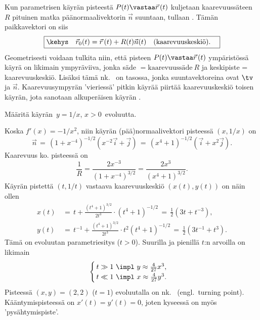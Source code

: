 Kun parametrisen käyrän pisteestä $P(t)\vastaa\vec r\,(t)$ kuljetaan kaarevuussäteen $R$
pituinen matka päänormaalivektorin $\vec n$ suuntaan, tullaan . Tämän
paikkavektori on siis
\[
\boxed{\kehys\quad \vec r_0(t)=\vec r\,(t)+R(t)\vec n(t) \quad\text{(kaarevuuskeskiö)}. \quad}
\]
Geometrisesti voidaan tulkita niin, että pisteen $P(t)\vastaa\vec r\,(t)$ ympäristössä käyrä 
on likimain ympyräviiva, jonka säde $=\text{kaarevuussäde}\ R$ ja keskipiste =
kaarevuuskeskiö. Lisäksi tämä nk.\
%
 on tasossa, jonka suuntavektoreina
ovat $\tv$ ja $\vec n$. Kaarevuusympyrän 'vieriessä' pitkin käyrää piirtää kaarevuuskeskiö
toisen käyrän, jota sanotaan alkuperäisen käyrän \kor{evoluutaksi}.
\begin{Exa} \label{evoluutta} Määritä käyrän $\,y=1/x$, $x>0\,$ evoluutta.
\end{Exa}
\ratk Koska $f'(x)=-1/x^2$, niin käyrän (pää)normaalivektori pisteessä $(x,1/x)$ on
\[
\vec n \,=\, (1+x^{-4})^{-1/2}(x^{-2}\vec i + \vec j)
       \,=\, (x^4+1)^{-1/2}(\vec i + x^2\vec j).
\]
Kaarevuus ko. pisteessä on
\[
\frac{1}{R}=\frac{2x^{-3}}{(1+x^{-4})^{3/2}}=\frac{2x^3}{(x^4+1)^{3/2}}.
\]
Käyrän pistettä $(t,1/t)$ vastaava kaarevuuskeskiö $(x(t),y(t))$ on näin ollen
\begin{align*}
x(t) &\,=\, t+\frac{(t^4+1)^{3/2}}{2t^3}\cdot (t^4+1)^{-1/2} 
      \,=\, \frac{1}{2}(3t+t^{-3}), \\
y(t) &\,=\, t^{-1}+\frac{(t^4+1)^{3/2}}{2t^3}\cdot t^2(t^4+1)^{-1/2} 
      \,=\,\frac{1}{2}(3t^{-1}+t^3).
\end{align*}
Tämä on evoluutan parametriesitys ($t>0$). Suurilla ja pienillä $t$:n arvoilla on likimain
\[ 
\begin{cases}
\,t\gg 1\ \impl\ y\approx\frac{4}{27}x^3, \\
\,t\ll 1\ \impl\ x\approx\frac{4}{27}y^3.
\end{cases}
\]
Pisteessä $(x,y)=(2,2)$ ($t=1$) evoluutalla on nk.\
%
\kor{kääntymispiste} (engl.\ turn\-ing point). Kääntymispisteessä on $x'(t)=y'(t)=0$, joten
kyseessä on myös 'pysähtymispiste'. \loppu
